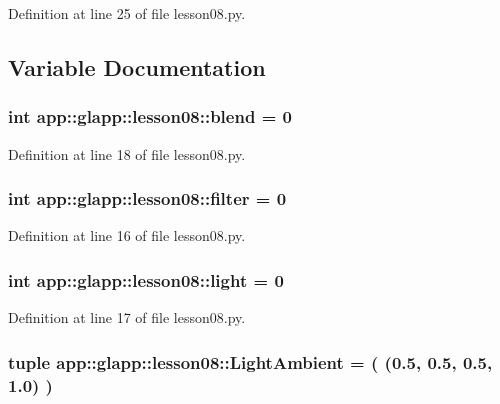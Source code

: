 Definition at line 25 of file lesson08.py.

\subsection{Variable Documentation}
\subsubsection{\setlength{\rightskip}{0pt plus 5cm}int {\bf app::glapp::lesson08::blend} = 0\hspace{0.3cm}{\tt  [static]}}\label{namespaceapp_1_1glapp_1_1lesson08_c82bb829d8a28193d3a40663bda78bea}




Definition at line 18 of file lesson08.py.
\subsubsection{\setlength{\rightskip}{0pt plus 5cm}int {\bf app::glapp::lesson08::filter} = 0\hspace{0.3cm}{\tt  [static]}}\label{namespaceapp_1_1glapp_1_1lesson08_f78128c4022372bd0d3a77efec074517}




Definition at line 16 of file lesson08.py.
\subsubsection{\setlength{\rightskip}{0pt plus 5cm}int {\bf app::glapp::lesson08::light} = 0\hspace{0.3cm}{\tt  [static]}}\label{namespaceapp_1_1glapp_1_1lesson08_7aa8add814f16b6841aa2024b40a605e}




Definition at line 17 of file lesson08.py.
\subsubsection{\setlength{\rightskip}{0pt plus 5cm}tuple {\bf app::glapp::lesson08::LightAmbient} = ( (0.5, 0.5, 0.5, 1.0) )\hspace{0.3cm}{\tt  [static]}}\label{namespaceapp_1_1glapp_1_1lesson08_21e6c4e07727a5680915d44d17f08df6}





